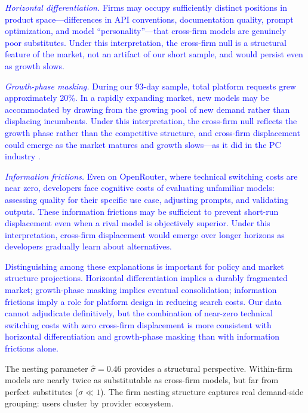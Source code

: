 \documentclass[11pt, a4paper]{article}
\begin{document}
\textcolor{blue}{\emph{Horizontal differentiation.} Firms may occupy sufficiently distinct positions in product space---differences in API conventions, documentation quality, prompt optimization, and model ``personality''---that cross-firm models are genuinely poor substitutes. Under this interpretation, the cross-firm null is a structural feature of the market, not an artifact of our short sample, and would persist even as growth slows.}

\textcolor{blue}{\emph{Growth-phase masking.} During our 93-day sample, total platform requests grew approximately 20\%. In a rapidly expanding market, new models may be accommodated by drawing from the growing pool of new demand rather than displacing incumbents. Under this interpretation, the cross-firm null reflects the growth phase rather than the competitive structure, and cross-firm displacement could emerge as the market matures and growth slows---as it did in the PC industry \citep{bresnahan1999technological}.}

\textcolor{blue}{\emph{Information frictions.} Even on OpenRouter, where technical switching costs are near zero, developers face cognitive costs of evaluating unfamiliar models: assessing quality for their specific use case, adjusting prompts, and validating outputs. These information frictions may be sufficient to prevent short-run displacement even when a rival model is objectively superior. Under this interpretation, cross-firm displacement would emerge over longer horizons as developers gradually learn about alternatives.}

\textcolor{blue}{Distinguishing among these explanations is important for policy and market structure projections. Horizontal differentiation implies a durably fragmented market; growth-phase masking implies eventual consolidation; information frictions imply a role for platform design in reducing search costs. Our data cannot adjudicate definitively, but the combination of near-zero technical switching costs with zero cross-firm displacement is more consistent with horizontal differentiation and growth-phase masking than with information frictions alone.}

The nesting parameter $\hat{\sigma} = 0.46$ provides a structural perspective. Within-firm models are nearly twice as substitutable as cross-firm models, but far from perfect substitutes ($\sigma \ll 1$). The firm nesting structure captures real demand-side grouping: users cluster by provider ecosystem.
\end{document}
